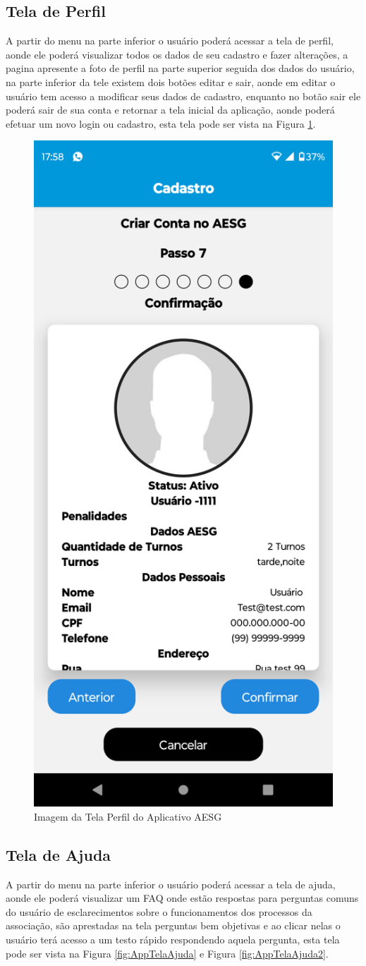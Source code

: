 \documentclass[
    12pt,                   %
    openright,              %
    oneside,                %
    a4paper,                %
    sumario=tradicional,    %
    english,                %
    brazil,                 %
    ]{abntex2}
\begin{document}
        \newpage
        \subsection{Tela de Perfil}
            A partir do menu na parte inferior o usuário poderá acessar a tela de perfil, aonde ele poderá visualizar todos os dados de seu cadastro e fazer alterações, a pagina apresente a foto de perfil na parte superior seguida dos dados do usuário, na parte inferior da tele existem dois botões editar e sair, aonde em editar o usuário tem acesso a modificar seus dados de cadastro, enquanto no botão sair ele poderá sair de sua conta e retornar a tela inicial da aplicação, aonde poderá efetuar um novo login ou cadastro, esta tela pode ser vista na Figura \ref{fig:AppTelaPerfil}.
    
            \begin{figure}[!h]
                \begin{center}
                \centering
                \includegraphics[width=0.4\linewidth]{Imagens/App Images User/AUCadastroConf1.png}
                \end{center}
                \caption[Imagem da Tela Perfil do Aplicativo AESG]{ 
                Imagem da Tela Perfil do Aplicativo AESG}
                \label{fig:AppTelaPerfil}
            \end{figure}

        \subsection{Tela de Ajuda}
            A partir do menu na parte inferior o usuário poderá acessar a tela de ajuda, aonde ele poderá visualizar um FAQ onde estão respostas para perguntas comuns do usuário de esclarecimentos sobre o funcionamentos dos processos da associação, são aprestadas na tela perguntas bem objetivas e ao clicar nelas o usuário terá acesso a um testo rápido respondendo aquela pergunta, esta tela pode ser vista na Figura \ref{fig:AppTelaAjuda} e Figura \ref{fig:AppTelaAjuda2}.
\end{document}
